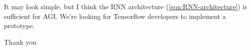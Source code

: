 \documentclass{beamer}
\begin{document}
\begin{frame}
It may look simple, but I think the RNN architecture (\ref{eqn:RNN-architecture}) is sufficient for AGI.  We're looking for Tensorflow developers to implement a prototype.

\vspace*{1cm}
\Large{\centerline{Thank you}}

\end{frame}
\end{document}
